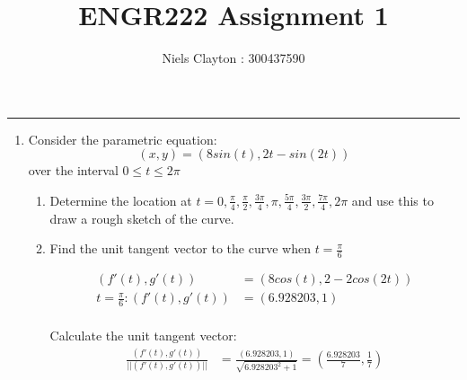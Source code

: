 \documentclass[a4paper,11pt]{article}
\begin{document}
\begin{preview}
\title{\LARGE{\textbf{ENGR222 Assignment 1}}}
\author{Niels Clayton : 300437590}
\date{}
\maketitle
\hrule

\begin{enumerate}
    \item Consider the parametric equation: $$ (x,y) = (8sin(t), 2t-sin(2t)) $$ over the interval $ 0 \leq t \leq 2\pi $

    \begin{enumerate}
        \item Determine the location at $ t=0 , \frac{\pi}{4}, \frac{\pi}{2}, \frac{3\pi}{4}, \pi, \frac{5\pi}{4}, \frac{3\pi}{2}, \frac{7\pi}{4}, 2\pi$ and use this to draw a rough sketch of the curve.
        
        \begin{center}
        \end{center}

        \item Find the unit tangent vector to the curve when $t = \frac{\pi}{6} $

        \begin{align*}
            \left(f'(t), g'(t)\right) &= \left( 8 cos(t), 2 - 2 cos(2t)\right)\\
            t = \frac{\pi}{6} : \left(f'(t), g'(t)\right) &= (6.928203, 1)\\
        \end{align*}

        Calculate the unit tangent vector:
        \begin{align*}
            \frac{(f'(t), g'(t))}{||(f'(t), g'(t))||} &= \frac{(6.928203, 1)}{\sqrt{6.928203^2 + 1}} = \left( \frac{6.928203}{7}, \frac{1}{7}\right)\\
        \end{align*}


\end{enumerate}
\end{enumerate}
\end{preview}
\end{document}
